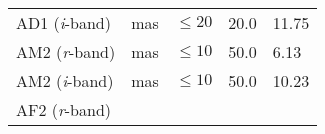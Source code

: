 \documentclass[DM,toc]{lsstdoc}
\begin{document}
\begin{longtable}[]{@{}lllll@{}}
\begin{minipage}[t]{0.19\columnwidth}
AD1 (\emph{i}-band)\strut
\end{minipage} & \begin{minipage}[t]{0.08\columnwidth}\raggedright\strut
mas\strut
\end{minipage} & \begin{minipage}[t]{0.20\columnwidth}\raggedright\strut
\(\leq 20\)\strut
\end{minipage} & \begin{minipage}[t]{0.22\columnwidth}\raggedright\strut
20.0\strut
\end{minipage} & \begin{minipage}[t]{0.17\columnwidth}\raggedright\strut
11.75\strut
\end{minipage}\tabularnewline
\begin{minipage}[t]{0.19\columnwidth}\raggedright\strut
AM2 (\emph{r}-band)\strut
\end{minipage} & \begin{minipage}[t]{0.08\columnwidth}\raggedright\strut
mas\strut
\end{minipage} & \begin{minipage}[t]{0.20\columnwidth}\raggedright\strut
\(\leq 10\)\strut
\end{minipage} & \begin{minipage}[t]{0.22\columnwidth}\raggedright\strut
50.0\strut
\end{minipage} & \begin{minipage}[t]{0.17\columnwidth}\raggedright\strut
6.13\strut
\end{minipage}\tabularnewline
\begin{minipage}[t]{0.19\columnwidth}\raggedright\strut
AM2 (\emph{i}-band)\strut
\end{minipage} & \begin{minipage}[t]{0.08\columnwidth}\raggedright\strut
mas\strut
\end{minipage} & \begin{minipage}[t]{0.20\columnwidth}\raggedright\strut
\(\leq 10\)\strut
\end{minipage} & \begin{minipage}[t]{0.22\columnwidth}\raggedright\strut
50.0\strut
\end{minipage} & \begin{minipage}[t]{0.17\columnwidth}\raggedright\strut
10.23\strut
\end{minipage}\tabularnewline
\begin{minipage}[t]{0.19\columnwidth}\raggedright\strut
AF2 (\emph{r}-band)\strut
\end{minipage} & \begin{minipage}[t]{0.08\columnwidth}\raggedright\strut

\end{minipage}
\end{longtable}
\end{document}
